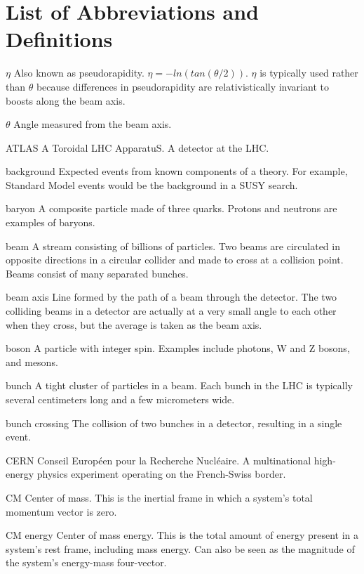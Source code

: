 \chapter*{List of Abbreviations and Definitions}

\begin{symbollist*}
\item[$\eta$] Also known as pseudorapidity. $\eta=-ln(tan(\theta/2))$. $\eta$ is typically used rather than $\theta$ because differences in pseudorapidity are relativistically invariant to boosts along the beam axis.
\item[$\theta$] Angle measured from the beam axis.
\item[ATLAS] A Toroidal LHC ApparatuS. A detector at the LHC.
\item[background] Expected events from known components of a theory. For example, Standard Model events would be the background in a SUSY search.
\item[baryon] A composite particle made of three quarks. Protons and neutrons are examples of baryons.
\item[beam] A stream consisting of billions of particles. Two beams are circulated in opposite directions in a circular collider and made to cross at a collision point. Beams consist of many separated bunches.
\item[beam axis] Line formed by the path of a beam through the detector. The two colliding beams in a detector are actually at a very small angle to each other when they cross, but the average is taken as the beam axis.
\item[boson] A particle with integer spin. Examples include photons, W and Z bosons, and mesons.
\item[bunch] A tight cluster of particles in a beam. Each bunch in the LHC is typically several centimeters long and a few micrometers wide.
\item[bunch crossing] The collision of two bunches in a detector, resulting in a single event.
\item[CERN] Conseil Européen pour la Recherche Nucléaire. A multinational high-energy physics experiment operating on the French-Swiss border.
\item[CM] Center of mass. This is the inertial frame in which a system's total momentum vector is zero.
\item[CM energy] Center of mass energy. This is the total amount of energy present in a system's rest frame, including mass energy. Can also be seen as the magnitude of the system's energy-mass four-vector.

\end{symbollist*}
